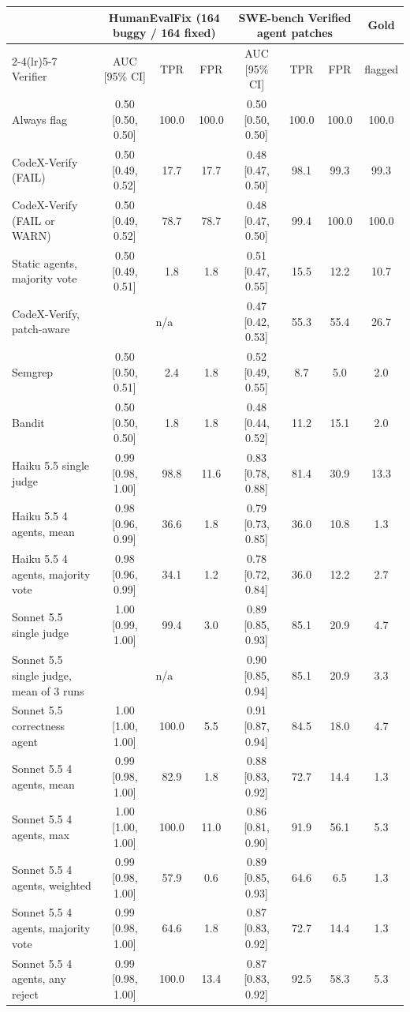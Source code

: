 \begin{tabular}{@{}l ccc ccc c@{}}
\toprule
 & \multicolumn{3}{c}{HumanEvalFix (164 buggy / 164 fixed)} & \multicolumn{3}{c}{SWE-bench Verified agent patches} & Gold \\
\cmidrule(lr){2-4}\cmidrule(lr){5-7}
Verifier & AUC [95\% CI] & TPR & FPR & AUC [95\% CI] & TPR & FPR & flagged \\
\midrule
Always flag & 0.50 [0.50, 0.50] & 100.0 & 100.0 & 0.50 [0.50, 0.50] & 100.0 & 100.0 & 100.0 \\
\midrule
CodeX-Verify (FAIL) & 0.50 [0.49, 0.52] & 17.7 & 17.7 & 0.48 [0.47, 0.50] & 98.1 & 99.3 & 99.3 \\
CodeX-Verify (FAIL or WARN) & 0.50 [0.49, 0.52] & 78.7 & 78.7 & 0.48 [0.47, 0.50] & 99.4 & 100.0 & 100.0 \\
Static agents, majority vote & 0.50 [0.49, 0.51] & 1.8 & 1.8 & 0.51 [0.47, 0.55] & 15.5 & 12.2 & 10.7 \\
CodeX-Verify, patch-aware & \multicolumn{3}{c}{n/a} & 0.47 [0.42, 0.53] & 55.3 & 55.4 & 26.7 \\
\midrule
Semgrep & 0.50 [0.50, 0.51] & 2.4 & 1.8 & 0.52 [0.49, 0.55] & 8.7 & 5.0 & 2.0 \\
Bandit & 0.50 [0.50, 0.50] & 1.8 & 1.8 & 0.48 [0.44, 0.52] & 11.2 & 15.1 & 2.0 \\
\midrule
Haiku 5.5 single judge & 0.99 [0.98, 1.00] & 98.8 & 11.6 & 0.83 [0.78, 0.88] & 81.4 & 30.9 & 13.3 \\
Haiku 5.5 4 agents, mean & 0.98 [0.96, 0.99] & 36.6 & 1.8 & 0.79 [0.73, 0.85] & 36.0 & 10.8 & 1.3 \\
Haiku 5.5 4 agents, majority vote & 0.98 [0.96, 0.99] & 34.1 & 1.2 & 0.78 [0.72, 0.84] & 36.0 & 12.2 & 2.7 \\
Sonnet 5.5 single judge & 1.00 [0.99, 1.00] & 99.4 & 3.0 & 0.89 [0.85, 0.93] & 85.1 & 20.9 & 4.7 \\
Sonnet 5.5 single judge, mean of 3 runs & \multicolumn{3}{c}{n/a} & 0.90 [0.85, 0.94] & 85.1 & 20.9 & 3.3 \\
Sonnet 5.5 correctness agent & 1.00 [1.00, 1.00] & 100.0 & 5.5 & 0.91 [0.87, 0.94] & 84.5 & 18.0 & 4.7 \\
Sonnet 5.5 4 agents, mean & 0.99 [0.98, 1.00] & 82.9 & 1.8 & 0.88 [0.83, 0.92] & 72.7 & 14.4 & 1.3 \\
Sonnet 5.5 4 agents, max & 1.00 [1.00, 1.00] & 100.0 & 11.0 & 0.86 [0.81, 0.90] & 91.9 & 56.1 & 5.3 \\
Sonnet 5.5 4 agents, weighted & 0.99 [0.98, 1.00] & 57.9 & 0.6 & 0.89 [0.85, 0.93] & 64.6 & 6.5 & 1.3 \\
Sonnet 5.5 4 agents, majority vote & 0.99 [0.98, 1.00] & 64.6 & 1.8 & 0.87 [0.83, 0.92] & 72.7 & 14.4 & 1.3 \\
Sonnet 5.5 4 agents, any reject & 0.99 [0.98, 1.00] & 100.0 & 13.4 & 0.87 [0.83, 0.92] & 92.5 & 58.3 & 5.3 \\
\bottomrule
\end{tabular}
